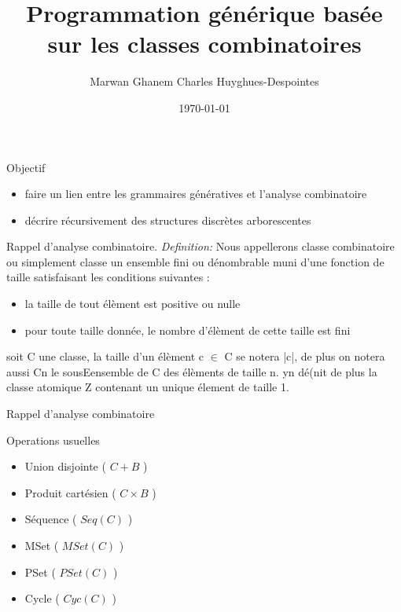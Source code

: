 \documentclass{beamer}
\title{Programmation générique basée sur les classes combinatoires}
\author{Marwan Ghanem  Charles Huyghues-Despointes}
\date{\today}
\begin{document}
\maketitle





\begin{frame}{Objectif}

\begin{itemize}
\item faire un lien entre les grammaires génératives et l'analyse combinatoire
\item décrire récursivement des structures discrètes arborescentes
\end{itemize}

\end{frame}



\begin{frame}{Rappel d'analyse combinatoire.}
\emph{Definition:} \newline
Nous appellerons classe combinatoire ou simplement classe un ensemble fini ou dénombrable
muni d'une fonction de taille satisfaisant les conditions suivantes :
\begin{itemize}
\item la taille de tout élèment est positive ou nulle
\item pour toute taille donnée, le nombre d'élèment de cette taille est fini
\end{itemize}

soit C une classe, la taille d'un élèment c $\in$  C se notera |c|, de plus on notera aussi Cn le sousEensemble
de C des élèments de taille n.
yn dé(nit de plus la classe atomique Z contenant un unique élement de taille 1.


\end{frame}






\begin{frame}{Rappel d'analyse combinatoire}

Operations usuelles
\begin{itemize}
\item Union disjointe ( $C + B$ )
\item Produit cartésien ( $C \times B$ )
\item Séquence ( $Seq(C)$ )
\item MSet ( $MSet(C)$ )
\item PSet ( $PSet(C)$ )
\item Cycle ( $Cyc(C)$ )
\end{itemize}

\end{frame}
\end{document}

